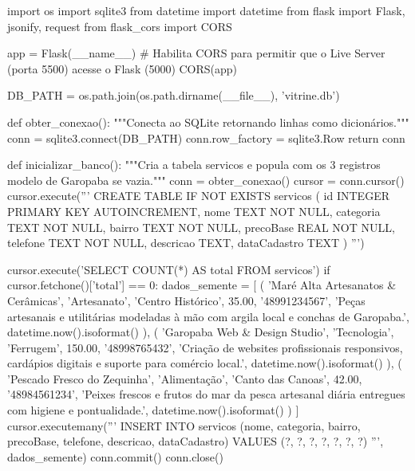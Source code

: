 \begin{boxCodigoPY}
import os
import sqlite3
from datetime import datetime
from flask import Flask, jsonify, request
from flask_cors import CORS

app = Flask(__name__)
# Habilita CORS para permitir que o Live Server (porta 5500) acesse o Flask (5000)
CORS(app)

DB_PATH = os.path.join(os.path.dirname(__file__), 'vitrine.db')

def obter_conexao():
    """Conecta ao SQLite retornando linhas como dicionários."""
    conn = sqlite3.connect(DB_PATH)
    conn.row_factory = sqlite3.Row
    return conn

def inicializar_banco():
    """Cria a tabela servicos e popula com os 3 registros modelo de Garopaba se vazia."""
    conn = obter_conexao()
    cursor = conn.cursor()
    cursor.execute('''
        CREATE TABLE IF NOT EXISTS servicos (
            id INTEGER PRIMARY KEY AUTOINCREMENT,
            nome TEXT NOT NULL,
            categoria TEXT NOT NULL,
            bairro TEXT NOT NULL,
            precoBase REAL NOT NULL,
            telefone TEXT NOT NULL,
            descricao TEXT,
            dataCadastro TEXT
        )
    ''')

    cursor.execute('SELECT COUNT(*) AS total FROM servicos')
    if cursor.fetchone()['total'] == 0:
        dados_semente = [
            (
                'Maré Alta Artesanatos & Cerâmicas', 'Artesanato', 'Centro Histórico',
                35.00, '48991234567',
                'Peças artesanais e utilitárias modeladas à mão com argila local e conchas de Garopaba.',
                datetime.now().isoformat()
            ),
            (
                'Garopaba Web & Design Studio', 'Tecnologia', 'Ferrugem',
                150.00, '48998765432',
                'Criação de websites profissionais responsivos, cardápios digitais e suporte para comércio local.',
                datetime.now().isoformat()
            ),
            (
                'Pescado Fresco do Zequinha', 'Alimentação', 'Canto das Canoas',
                42.00, '48984561234',
                'Peixes frescos e frutos do mar da pesca artesanal diária entregues com higiene e pontualidade.',
                datetime.now().isoformat()
            )
        ]
        cursor.executemany('''
            INSERT INTO servicos (nome, categoria, bairro, precoBase, telefone, descricao, dataCadastro)
            VALUES (?, ?, ?, ?, ?, ?, ?)
        ''', dados_semente)
        conn.commit()
    conn.close()


\end{boxCodigoPY}
